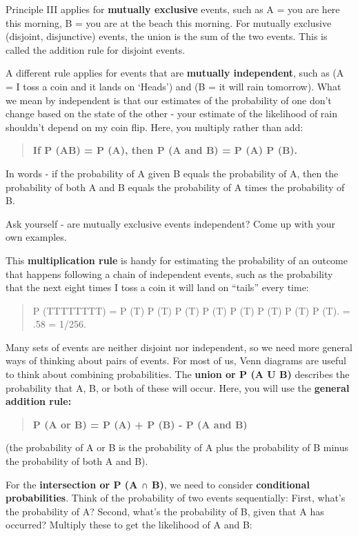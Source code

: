 \documentclass[
  openany]{book}
\begin{document}
Principle III applies for \textbf{mutually exclusive} events, such as A = you are here this morning, B = you are at the beach this morning. For mutually exclusive (disjoint, disjunctive) events, the union is the sum of the two events. This is called the addition rule for disjoint events.

A different rule applies for events that are \textbf{mutually independent}, such as (A = I toss a coin and it lands on `Heads') and (B = it will rain tomorrow). What we mean by independent is that our estimates of the probability of one don't change based on the state of the other - your estimate of the likelihood of rain shouldn't depend on my coin flip. Here, you multiply rather than add:

\begin{quote}
\textbf{If P (A\textbar B) = P (A), then P (A and B) = P (A) P (B).}
\end{quote}

In words - if the probability of A given B equals the probability of A, then the probability of both A and B equals the probability of A times the probability of B.

Ask yourself - are mutually exclusive events independent? Come up with your own examples.

This \textbf{multiplication rule} is handy for estimating the probability of an outcome that happens following a chain of independent events, such as the probability that the next eight times I toss a coin it will land on ``tails'' every time:

\begin{quote}
P (TTTTTTTT) = P (T) P (T) P (T) P (T) P (T) P (T) P (T) P (T). = .58 = 1/256.
\end{quote}

Many sets of events are neither disjoint nor independent, so we need more general ways of thinking about pairs of events. For most of us, Venn diagrams are useful to think about combining probabilities. The \textbf{union or P (A U B)} describes the probability that A, B, or both of these will occur. Here, you will use the \textbf{general addition rule:}

\begin{quote}
\textbf{P (A or B) = P (A) + P (B) - P (A and B)}
\end{quote}

(the probability of A or B is the probability of A plus the probability of B minus the probability of both A and B).

For the \textbf{intersection or P (A ∩ B)}, we need to consider \textbf{conditional probabilities}. Think of the probability of two events sequentially: First, what's the probability of A? Second, what's the probability of B, given that A has occurred? Multiply these to get the likelihood of A and B:
\end{document}

